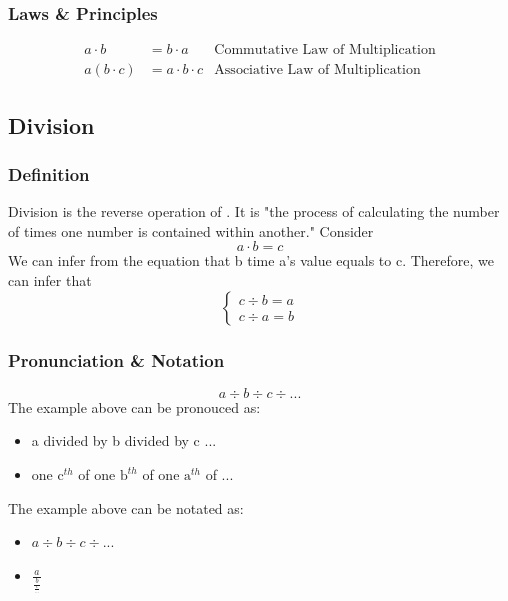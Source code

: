 \documentclass{article}
\begin{document}
    \subsubsection{Laws \& Principles}
    \begin{align*}
        a \cdot b &= b \cdot a &\text{Commutative Law of Multiplication}\\
        a(b \cdot c) &= a \cdot b \cdot c &\text{Associative Law of Multiplication}
    \end{align*}

    \subsection{Division}
    \label{section:divison}

    \subsubsection{Definition}
    \par
    Division is the reverse operation of . It is "the process of calculating the number of times one number is contained within another."\cite{division} Consider
    $$ a \cdot b = c$$
    We can infer from the equation that b time a's value equals to c. Therefore, we can infer that
    $$
    \left\{
        \begin{aligned}
            c \div b = a\\
            c \div a = b
        \end{aligned}
    \right.
    $$
    \par

    \subsubsection{Pronunciation \& Notation}
    $$a \div b \div c \div ... $$
    The example above can be pronouced as:
    \begin{itemize}
        \item a divided by b divided by c ...
        \item one $\mathrm c^{th}$ of one $\mathrm b^{th}$ of one $\mathrm a^{th}$ of ...
    \end{itemize}
    The example above can be notated as:
    \begin{itemize}
        \item $a \div b \div c \div ...$
        \item $\frac{a}{\frac{b}{\frac{c}{...}}}$
    \end{itemize}
\end{document}
